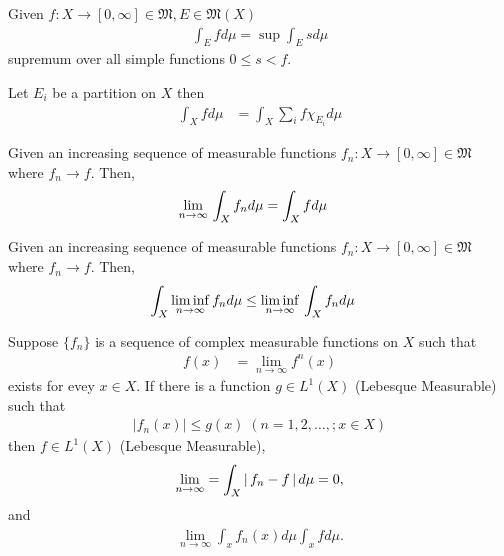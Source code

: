 \documentclass[10pt,a4paper]{report}
\begin{document}
\begin{definition} Given $f: X \to [0,\infty]\in \mathfrak{M}, E \in \mathfrak{M}(X)$ 
\begin{align*}
	\int_E fd\mu = \sup \int_E s d\mu
\end{align*}supremum over all simple functions $0\le s< f$.
\end{definition}

\begin{theorem}
	Let $E_i$ be a partition on $X$ then
	\begin{align*}
		\int_X f d\mu &= \int_X \sum_i f\chi_{E_i} d\mu 
	\end{align*}
\end{theorem}

\begin{theorem} Given an increasing sequence of measurable functions $f_n : X \to [0,\infty] \in \mathfrak{M}$ where $f_n \to f$. Then,
\begin{align*}
	\underset{n \to \infty}\lim\, \int_X f_n d\mu &= \int_X f d\mu 
\end{align*}

\end{theorem}

\begin{theorem} Given an increasing sequence of measurable functions $f_n : X \to [0,\infty] \in \mathfrak{M}$ where $f_n \to f$. Then,
\begin{align*}
	\int_X \underset{n\to\infty}\liminf \, f_n d\mu &\le \underset{n\to\infty}\liminf \, \int_X f_n d\mu 
\end{align*}

\end{theorem}

\begin{theorem}  Suppose $\{f_n\}$ is a sequence of complex measurable functions on $X$ such that 
\begin{align}
	f(x) &= \lim_{n\to\infty} f^n(x)
\end{align}exists for evey $x \in X$.  If there is a function $g\in L^1(X)$ (Lebesque Measurable) such that
\begin{align}
	|f_n(x)| \le g(x) \; (n=1,2,\dots,; x\in X)
\end{align}then $f \in L^1(X)$ (Lebesque Measurable),
\begin{align}
	\lim_{n\to \infty} = \int_X \left |\, f_n-f \,\right |d\mu = 0,
\end{align}and
\begin{align}
	\lim_{n\to \infty} \int_x f_n(x)d\mu \int_x fd\mu. 
\end{align}

\end{theorem}
\end{document}

